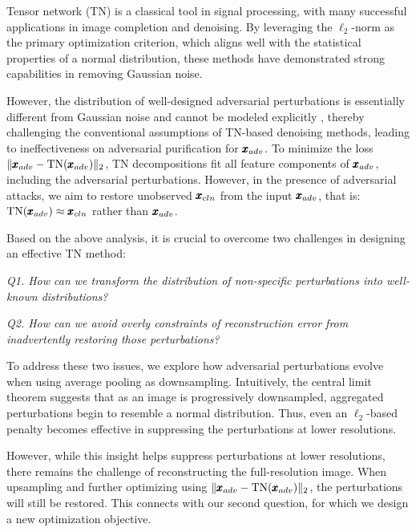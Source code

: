 Tensor network (TN) is a classical tool in signal processing, with many successful applications in image completion and denoising. By leveraging the $\ell_2$-norm as the primary optimization criterion, which aligns well with the statistical properties of a normal distribution, these methods \citep{phan2020tensor,loeschcke2024coarse} have demonstrated strong capabilities in removing Gaussian noise.

However, the distribution of well-designed adversarial perturbations is essentially different from Gaussian noise and cannot be modeled explicitly \citep{ilyas2019adversarial,allen2022feature}, thereby challenging the conventional assumptions of TN-based denoising methods, leading to ineffectiveness on adversarial purification for $\pmb{x}_{adv}$.
To minimize the loss $\|\pmb{x}_{adv} - \text{TN}(\pmb{x}_{adv})\|_{2}$, TN decompositions fit all feature components of $\pmb{x}_{adv}$, including the adversarial perturbations. However, in the presence of adversarial attacks, we aim to restore unobserved $\pmb{x}_{cln}$ from the input $\pmb{x}_{adv}$, that is: $\text{TN}(\pmb{x}_{adv}) \approx \pmb{x}_{cln}$ rather than $\pmb{x}_{adv}$.

Based on the above analysis, it is crucial to overcome two challenges in designing an effective TN method:

\quad \emph{Q1. How can we transform the distribution of non-specific perturbations into well-known distributions?}

\quad \emph{Q2. How can we avoid overly constraints of reconstruction error from inadvertently restoring those perturbations?}


To address these two issues, we explore how adversarial perturbations evolve when using average pooling as downsampling. Intuitively, the central limit theorem suggests that as an image is progressively downsampled, aggregated perturbations begin to resemble a normal distribution. Thus, even an $\ell_2$-based penalty becomes effective in suppressing the perturbations at lower resolutions.

However, while this insight helps suppress perturbations at lower resolutions, there remains the challenge of reconstructing the full-resolution image. When upsampling and further optimizing using $\|\pmb{x}_{adv} - \text{TN}(\pmb{x}_{adv})\|_{2}$, the perturbations will still be restored. This connects with our second question, for which we design a new optimization objective.


